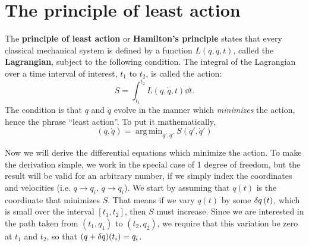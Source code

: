 \documentclass{book}
\DeclareMathOperator*{\argmin}{arg\,min}
\begin{document}
\section{The principle of least action}

The \textbf{principle of least action} or \textbf{Hamilton's principle} states that every classical mechanical system is defined by a function $L(q, \dot{q}, t)$, called the \textbf{Lagrangian}, subject to the following condition. The integral of the Lagrangian over a time interval of interest, $t_1$ to $t_2$, is called the action:
%
\begin{equation}
  S = \int_{t_1}^{t_2} L(q, \dot{q}, t) \dd{t}.
\end{equation}
%
The condition is that $q$ and $\dot{q}$ evolve in the manner which \emph{minimizes} the action, hence the phrase ``least action''. To put it mathematically,
%
\begin{equation}
  (q, \dot{q}) = \argmin_{q', \dot{q}'} S(q', \dot{q}')
\end{equation}

Now we will derive the differential equations which minimize the action. To make the derivation simple, we work in the special case of 1 degree of freedom, but the result will be valid for an arbitrary number, if we simply index the coordinates and velocities (i.e. $q \to q_i$, $\dot{q} \to \dot{q}_i$). We start by assuming that $q(t)$ is the coordinate that minimizes $S$. That means if we vary $q(t)$ by some $\var{q}(t)$, which is small over the interval $[t_1, t_2]$, then $S$ must increase. Since we are interested in the path taken from $(t_1, q_1)$ to $(t_2, q_2)$, we require that this variation be zero at $t_1$ and $t_2$, so that $(q + \var{q})(t_i) = q_i$.
\end{document}
